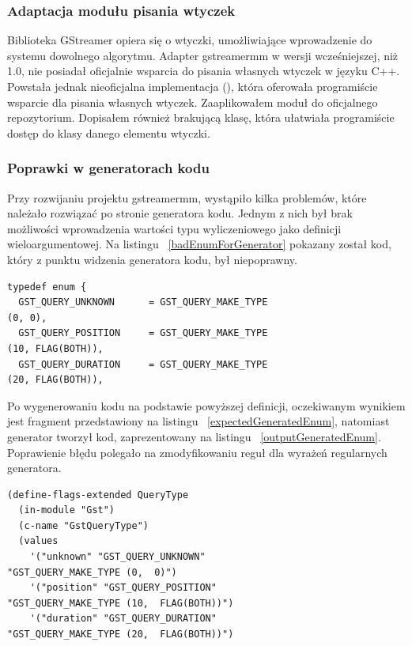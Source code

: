 \documentclass[12pt]{article}
\begin{document}
\subsubsection{Adaptacja modułu pisania wtyczek}
Biblioteka GStreamer opiera się o wtyczki, umożliwiające wprowadzenie do systemu dowolnego algorytmu. Adapter gstreamermm w wersji wcześniejszej, niż 1.0, nie posiadał oficjalnie wsparcia do pisania własnych wtyczek w języku C++. Powstała jednak nieoficjalna implementacja (\cite{pepergithub}), która oferowała programiście wsparcie dla pisania własnych wtyczek. Zaaplikowałem moduł do oficjalnego repozytorium. Dopisałem również brakującą klasę, która ułatwiała programiście dostęp do klasy danego elementu wtyczki.
\subsubsection{Poprawki w generatorach kodu}
Przy rozwijaniu projektu gstreamermm, wystąpiło kilka problemów, które należało rozwiązać po stronie generatora kodu. Jednym z nich był brak możliwości wprowadzenia wartości typu wyliczeniowego jako definicji wieloargumentowej. Na listingu ~\ref{badEnumForGenerator} pokazany został kod, który z punktu widzenia generatora kodu, był niepoprawny.
    \begin{lstlisting}[caption=Przykładowy fragment niepoprawnego z punktu widzenia generatora kodu źródłowego, label=badEnumForGenerator]
typedef enum {
  GST_QUERY_UNKNOWN      = GST_QUERY_MAKE_TYPE
(0, 0),
  GST_QUERY_POSITION     = GST_QUERY_MAKE_TYPE 
(10, FLAG(BOTH)),
  GST_QUERY_DURATION     = GST_QUERY_MAKE_TYPE 
(20, FLAG(BOTH)),
    \end{lstlisting}

Po wygenerowaniu kodu na podstawie powyższej definicji, oczekiwanym wynikiem jest fragment przedstawiony na listingu ~\ref{expectedGeneratedEnum}, natomiast generator tworzył kod, zaprezentowany na listingu ~\ref{outputGeneratedEnum}. Poprawienie błędu polegało na zmodyfikowaniu reguł dla wyrażeń regularnych generatora.

    \begin{lstlisting}[caption=Oczekiwany wynik działania generatora kodu, label=expectedGeneratedEnum]
(define-flags-extended QueryType
  (in-module "Gst")
  (c-name "GstQueryType")
  (values
    '("unknown" "GST_QUERY_UNKNOWN" 
"GST_QUERY_MAKE_TYPE (0,  0)")
    '("position" "GST_QUERY_POSITION" 
"GST_QUERY_MAKE_TYPE (10,  FLAG(BOTH))")
    '("duration" "GST_QUERY_DURATION" 
"GST_QUERY_MAKE_TYPE (20,  FLAG(BOTH))")
    \end{lstlisting}
\end{document}
